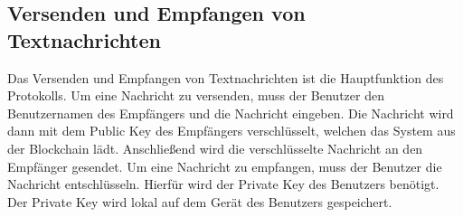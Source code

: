 \subsection{Versenden und Empfangen von Textnachrichten}

Das Versenden und Empfangen von Textnachrichten ist die Hauptfunktion des Protokolls.
Um eine Nachricht zu versenden, muss der Benutzer den Benutzernamen des Empfängers und die Nachricht
eingeben. Die Nachricht wird dann mit dem Public Key des Empfängers verschlüsselt, welchen das System
aus der Blockchain lädt. Anschließend wird die verschlüsselte Nachricht an den Empfänger gesendet.
Um eine Nachricht zu empfangen, muss der Benutzer die Nachricht entschlüsseln. Hierfür wird der
Private Key des Benutzers benötigt. Der Private Key wird lokal auf dem Gerät des Benutzers gespeichert.